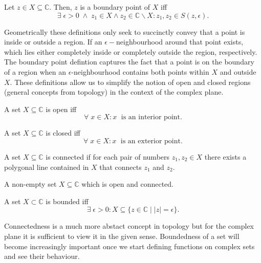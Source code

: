 \documentclass[12pt]{book}
\begin{document}
\begin{defn}
    Let $z \in X \subseteq \mathbb{C}.$ Then, $z$ is a boundary point of $X$ iff
    $$
        \exists\; \epsilon > 0\; \land \; z_1 \in X \land z_2 \in \mathbb{C}\backslash X:
            z_1, z_2 \in S(z, \epsilon).
    $$
\end{defn}
Geometrically these definitions only seek to succinctly convey that a point is inside or outside a region. If an $\epsilon-$neighbourhood around that point exists, which lies either completely inside or completely outside the region, respectively. The boundary point defintion captures the fact that a point is on the boundary of a region when an $\epsilon$-neighbourhood contains both points within $X$ and outside $X$. These definitions allow us to simplify the notion of open and closed regions (general concepts from topology) in the context of the complex plane. 

\begin{defn}
    A set $X \subseteq \mathbb{C}$ is open iff
    $$
        \forall\; x \in X: x\;\text{ is an interior point}.
    $$
\end{defn}

\begin{defn}
    A set $X \subseteq \mathbb{C}$ is closed iff
    $$
        \forall\; x \in X: x\;\text{ is an exterior point}.
    $$
\end{defn}

\begin{defn}
    A set $X \subseteq \mathbb{C}$ is connected if for each pair of numbers $z_1, z_2 \in X$ there exists a polygonal line contained in $X$ that connects $z_1$ and $z_2$.
\end{defn}

\begin{defn}[Domain]
    A non-empty set $X \subseteq \mathbb{C}$ which is open and connected. 
\end{defn}

\begin{defn}[Bounded]
    A set $X \subset \mathbb{C}$ is bounded iff
    $$
        \exists\; \epsilon > 0: X \subseteq \{z \in \mathbb{C}\; |\; |z| = \epsilon\}.
    $$
\end{defn}

Connectedness is a much more abstact concept in topology but for the complex plane it is sufficient to view it in the given sense. Boundedness of a set will become increasingly important once we start defining functions on complex sets and see their behaviour.
\end{document}
